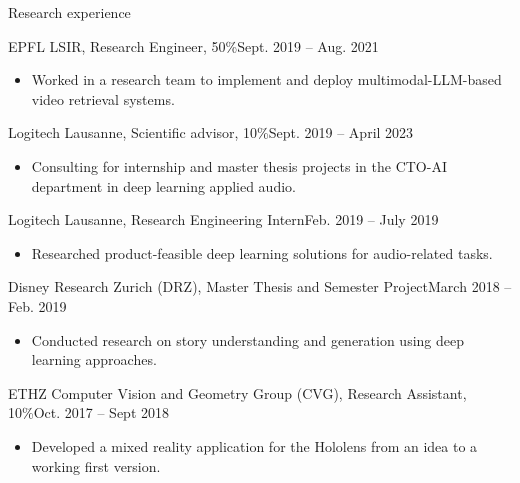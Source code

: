 \documentclass[]{mcdowellcv}
\begin{document}
\begin{cvsection}{Research experience}
	\begin{cvsubsection}{EPFL LSIR, Research Engineer, 50\%}{}{Sept. 2019 -- Aug. 2021}
            \begin{itemize}
              \item Worked in a research team to implement and deploy multimodal-LLM-based video retrieval systems.
            \end{itemize}
        \end{cvsubsection}
        \begin{cvsubsection}{Logitech Lausanne, Scientific advisor, 10\%}{}{Sept. 2019 -- April 2023}
            \begin{itemize}
              \item Consulting for internship and master thesis projects in the CTO-AI department in deep learning applied audio.
            \end{itemize}
        \end{cvsubsection}
	\begin{cvsubsection}{Logitech Lausanne, Research Engineering Intern}{}{Feb. 2019 -- July 2019}
            \begin{itemize}
              \item Researched product-feasible deep learning solutions for audio-related tasks.
            \end{itemize}
        \end{cvsubsection}
        \begin{cvsubsection}{Disney Research Zurich (DRZ), Master Thesis and Semester Project}{}{March 2018 -- Feb. 2019}
            \begin{itemize}
              \item Conducted research on story understanding and generation using deep learning approaches.
            \end{itemize}
        \end{cvsubsection}
        \begin{cvsubsection}{ETHZ Computer Vision and Geometry Group (CVG), Research Assistant, 10\%}{}{Oct. 2017 -- Sept 2018}
            \begin{itemize}
                \item Developed a mixed reality application for the Hololens from an idea to a working first version.
            \end{itemize}
        \end{cvsubsection}

    \end{cvsection}  
\end{document}
